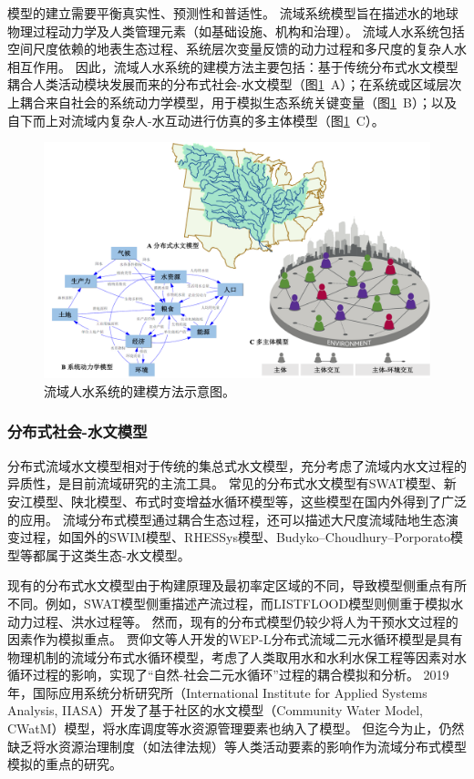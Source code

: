 
模型的建立需要平衡真实性、预测性和普适性\cite{gunderson2017}。
流域系统模型旨在描述水的地球物理过程动力学及人类管理元素（如基础设施、机构和治理）\cite{hadjimichael2020}。
流域人水系统包括空间尺度依赖的地表生态过程、系统层次变量反馈的动力过程和多尺度的复杂人水相互作用\cite{bodin2017b,sayles2017,sayles2019}。
因此，流域人水系统的建模方法主要包括：基于传统分布式水文模型耦合人类活动模块发展而来的分布式社会-水文模型（图\ref{ch1:fig:models}~A）；在系统或区域层次上耦合来自社会的系统动力学模型，用于模拟生态系统关键变量（图\ref{ch1:fig:models}~B）；以及自下而上对流域内复杂人-水互动进行仿真的多主体模型（图\ref{ch1:fig:models}~C）。

\begin{figure}[!ht]
    \centering
    \includegraphics[width=\textwidth]{img/ch1/ch1_models.png}
    \caption[流域人水系统的建模方法示意图]{流域人水系统的建模方法示意图。}\label{ch1:fig:models}
\end{figure}

\subsubsection{分布式社会-水文模型}

分布式流域水文模型相对于传统的集总式水文模型，充分考虑了流域内水文过程的异质性\cite{wangzhonggen2003}，是目前流域研究的主流工具。
常见的分布式水文模型有SWAT模型、新安江模型、陕北模型、布式时变增益水循环模型等，这些模型在国内外得到了广泛的应用\cite{arnold1998,xiajun2003,ficklin2009}。
流域分布式模型通过耦合生态过程，还可以描述大尺度流域陆地生态演变过程，如国外的SWIM模型\cite{krysanova2005}、RHESSys模型\cite{tague2004}、Budyko–Choudhury–Porporato模型\cite{donohue2012}等都属于这类生态-水文模型。

现有的分布式水文模型由于构建原理及最初率定区域的不同，导致模型侧重点有所不同。例如，SWAT模型侧重描述产流过程\cite{wangzhonggen2003a}，而LISTFLOOD模型则侧重于模拟水动力过程、洪水过程等\cite{zengzhaoyang2017}。
然而，现有的分布式模型仍较少将人为干预水文过程的因素作为模拟重点。
贾仰文等人开发的WEP-L分布式流域二元水循环模型是具有物理机制的流域分布式水循环模型，考虑了人类取用水和水利水保工程等因素对水循环过程的影响，实现了“自然-社会二元水循环”过程的耦合模拟和分析\cite{jia2010}。
2019年，国际应用系统分析研究所（International Institute for Applied Systems Analysis, IIASA）开发了基于社区的水文模型（Community Water Model, CWatM）模型，将水库调度等水资源管理要素也纳入了模型\cite{burek2020}。
但迄今为止，仍然缺乏将水资源治理制度（如法律法规）等人类活动要素的影响作为流域分布式模型模拟的重点的研究。

